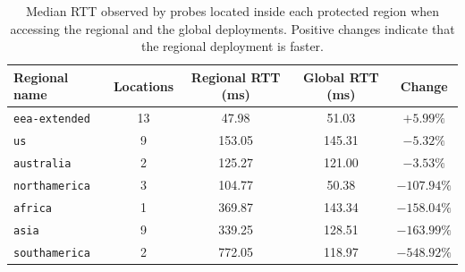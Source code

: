 \documentclass[
A4paper,                %
twoside,                %
openright,              %
chapterprefix=true,     %
12pt,                   %
headings=normal,        %
titlepage=on            %
]{book}
\begin{document}
\begin{table}[ht]
    \centering
    \small
    \caption{Median RTT observed by probes located inside each protected region when accessing the regional and the global deployments. Positive changes indicate that the regional deployment is faster.}
    \label{tab:rcadns_median_rtt}
    \begin{tabular}{lcccc}
        \toprule
        \textbf{Regional name} & \textbf{Locations} & \textbf{Regional RTT (ms)} & \textbf{Global RTT (ms)} & \textbf{Change} \\
        \midrule
        \texttt{eea-extended} & 13 & 47.98  & 51.03  & $+5.99\%$ \\
        \texttt{us}           &  9 & 153.05 & 145.31 & $-5.32\%$ \\
        \texttt{australia}    &  2 & 125.27 & 121.00 & $-3.53\%$ \\
        \texttt{northamerica} &  3 & 104.77 & 50.38  & $-107.94\%$ \\
        \texttt{africa}       &  1 & 369.87 & 143.34 & $-158.04\%$ \\
        \texttt{asia}         &  9 & 339.25 & 128.51 & $-163.99\%$ \\
        \texttt{southamerica} &  2 & 772.05 & 118.97 & $-548.92\%$ \\
        \bottomrule
    \end{tabular}
\end{table}
\end{document}

